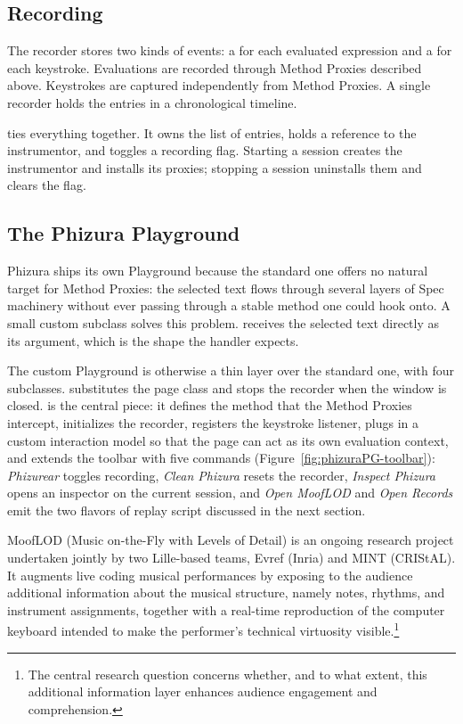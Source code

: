 \documentclass[
]{ceurart}
\begin{document}
\subsection{Recording}

The recorder stores two kinds of events: a  for each evaluated expression and a  for each keystroke.
Evaluations are recorded through Method Proxies described above.
Keystrokes are captured independently from Method Proxies. 
A single recorder holds the entries in a chronological timeline.

 ties everything together.
It owns the list of entries, holds a reference to the instrumentor, and toggles a recording flag.
Starting a session creates the instrumentor and installs its proxies; stopping a session uninstalls them and clears the flag.

\subsection{The Phizura Playground}

Phizura ships its own Playground because the standard one offers no natural target for Method Proxies: the selected text flows through several layers of Spec machinery without ever passing through a stable method one could hook onto.
A small custom subclass solves this problem.
 receives the selected text directly as its argument, which is the shape the handler expects.

The custom Playground is otherwise a thin layer over the standard one, with four subclasses.
 substitutes the page class and stops the recorder when the window is closed.
 is the central piece: it defines the method that the Method Proxies intercept, initializes the recorder, registers the keystroke listener, plugs in a custom interaction model so that the page can act as its own evaluation context, and extends the toolbar with five commands (Figure~\ref{fig:phizuraPG-toolbar}): \textit{Phizurear} toggles recording, \textit{Clean Phizura} resets the recorder, \textit{Inspect Phizura} opens an inspector on the current session, and \textit{Open MoofLOD} and \textit{Open Records} emit the two flavors of replay script discussed in the next section.

MoofLOD (Music on-the-Fly with Levels of Detail) is an ongoing research project undertaken jointly by two Lille-based teams, Evref (Inria) and MINT (CRIStAL). It augments live coding musical performances by exposing to the audience additional information about the musical structure, namely notes, rhythms, and instrument assignments, together with a real-time reproduction of the computer keyboard intended to make the performer's technical virtuosity visible.\footnote{The central research question concerns whether, and to what extent, this additional information layer enhances audience engagement and comprehension.}
\end{document}
